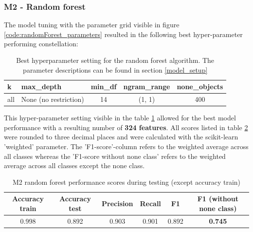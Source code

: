\subsubsection{M2 - Random forest}
The model tuning with the parameter grid visible in figure \ref{code:randomForest_parameters} resulted in the following best hyper-parameter performing constellation:\\

\begin{table}[h!]
\begin{center}
\caption{Best hyperparameter setting for the random forest algorithm. The parameter descriptions can be found in section \ref{model_setup}}\vspace{1ex}
\label{tab:m2_randomForest_bestParams}
\begin{tabular}{llccc}\hline
k & max\_depth & min\_df & ngram\_range & none\_objects \\ \hline
all & None (no restriction) & 14 & (1, 1) & 400 \\ \hline
\end{tabular}
\end{center}
\end{table}

This hyper-parameter setting visible in the table \ref{tab:m2_randomForest_bestParams} allowed for the best model performance with a resulting number of \textbf{324 features}. All scores listed in table \ref{tab:m2_randomForest_bestscores} were rounded to three decimal places and were calculated with the scikit-learn 'weighted' parameter. The 'F1-score'-column refers to the weighted average across all classes whereas the 'F1-score without none class' refers to the weighted average across all classes except the none class.

\begin{table}[h!]
\begin{center}
\caption{M2 random forest performance scores during testing (except accuracy train)}\vspace{1ex}
\label{tab:m2_randomForest_bestscores}
\begin{tabular}{cccccc}\hline
Accuracy train & Accuracy test & Precision & Recall & F1 & F1 (without none class)\\ \hline
0.998 & 0.892 & 0.903 & 0.901 & 0.892 & \textbf{0.745}\\ \hline
\end{tabular}
\end{center}
\end{table}

